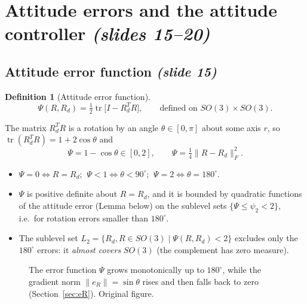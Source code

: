 \documentclass[11pt,a4paper]{article}
\newcommand{\tr}{\operatorname{tr}}
\newcommand{\sli}[1]{\emph{(#1)}}
\theoremstyle{definition}
\newtheorem{definition}{Definition}[section]
\theoremstyle{plain}
\theoremstyle{remark}
\begin{document}
\section{Attitude errors and the attitude controller \sli{slides 15--20}}

\subsection{Attitude error function \sli{slide 15}}

\begin{definition}[Attitude error function]
\[
\Psi(R,R_d)=\tfrac12\tr\!\big[I-R_d^TR\big],\qquad\text{defined on }SO(3)\times SO(3).
\]
\end{definition}

The matrix $R_d^TR$ is a rotation by an angle $\theta\in[0,\pi]$ about some axis $r$, so $\tr(R_d^TR)=1+2\cos\theta$ and
\[
\Psi=1-\cos\theta\in[0,2],\qquad \Psi=\tfrac14\|R-R_d\|_F^2 .
\]
\begin{itemize}
  \item $\Psi=0\iff R=R_d$; $\ \Psi<1\iff\theta<90^\circ$; $\ \Psi=2\iff\theta=180^\circ$.
  \item $\Psi$ is positive definite about $R=R_d$, and it is bounded by quadratic functions of the attitude error (Lemma below) on the sublevel sets $\{\Psi\le\psi_2<2\}$, i.e.\ for rotation errors smaller than $180^\circ$.
  \item The sublevel set $L_2=\{R_d,R\in SO(3)\mid\Psi(R,R_d)<2\}$ excludes only the $180^\circ$ errors: it \emph{almost covers} $SO(3)$ (the complement has zero measure).
\end{itemize}

\begin{figure}[h]
\centering
{}
\caption{The error function $\Psi$ grows monotonically up to $180^\circ$, while the gradient norm $\|e_R\|=\sin\theta$ rises and then falls back to zero (Section~\ref{sec:eR}). Original figure.}
\end{figure}
\end{document}
